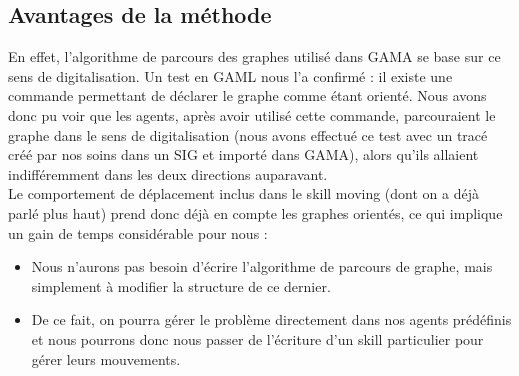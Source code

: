 \documentclass[11pt]{report} %
\begin{document}
\subsection{Avantages de la m\'ethode}
En effet, l'algorithme de parcours des graphes utilis\'e dans GAMA se base sur ce sens de digitalisation. Un test en GAML nous l'a confirm\'e : il existe une commande permettant de d\'eclarer le graphe comme \'etant orient\'e. Nous avons donc pu voir que les agents, apr\`es avoir utilis\'e cette commande, parcouraient le graphe dans le sens de digitalisation (nous avons effectu\'e ce test avec un trac\'e cr\'e\'e par nos soins dans un SIG et import\'e dans GAMA), alors qu'ils allaient indiff\'eremment dans les deux directions auparavant.\\
Le comportement de d\'eplacement inclus dans le skill \og moving \fg{} (dont on a d\'ej\`a parl\'e plus haut) prend donc d\'ej\`a en compte les graphes orient\'es, ce qui implique un gain de temps consid\'erable pour nous :
\begin{itemize}
 \item Nous n'aurons pas besoin d'\'ecrire l'algorithme de parcours de graphe, mais simplement \`a modifier la structure de ce dernier.
 \item De ce fait, on pourra g\'erer le probl\`eme directement dans nos agents pr\'ed\'efinis et nous pourrons donc nous passer de l'\'ecriture d'un \og skill \fg{} particulier pour g\'erer leurs mouvements.
\end{itemize}
\end{document}
